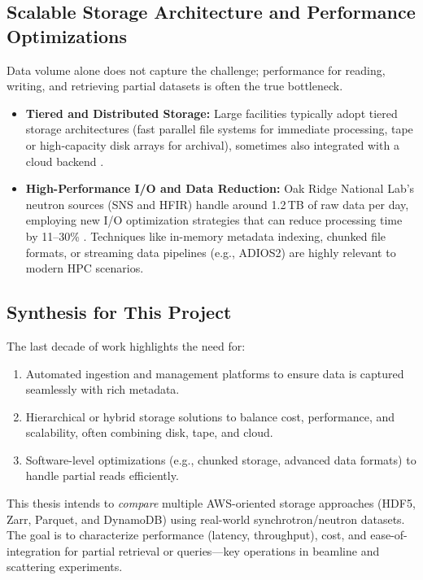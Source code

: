 \documentclass{article}
\begin{document}
\subsection{Scalable Storage Architecture and Performance Optimizations}
Data volume alone does not capture the challenge; performance for reading, writing, and retrieving partial datasets is often the true bottleneck.

\begin{itemize}
    \item \textbf{Tiered and Distributed Storage:} Large facilities typically adopt tiered storage architectures (fast parallel file systems for immediate processing, tape or high-capacity disk arrays for archival), sometimes also integrated with a cloud backend \cite{meyer2014store}.
    \item \textbf{High-Performance I/O and Data Reduction:} Oak Ridge National Lab’s neutron sources (SNS and HFIR) handle around 1.2\,TB of raw data per day, employing new I/O optimization strategies that can reduce processing time by 11--30\% \cite{godoy2021efficient}. Techniques like in-memory metadata indexing, chunked file formats, or streaming data pipelines (e.g., ADIOS2) are highly relevant to modern HPC scenarios.
\end{itemize}

\subsection{Synthesis for This Project}
The last decade of work highlights the need for:
\begin{enumerate}
    \item Automated ingestion and management platforms to ensure data is captured seamlessly with rich metadata.
    \item Hierarchical or hybrid storage solutions to balance cost, performance, and scalability, often combining disk, tape, and cloud.
    \item Software-level optimizations (e.g., chunked storage, advanced data formats) to handle partial reads efficiently.
\end{enumerate}
This thesis intends to \emph{compare} multiple AWS-oriented storage approaches (HDF5, Zarr, Parquet, and DynamoDB) using real-world synchrotron/neutron datasets. The goal is to characterize performance (latency, throughput), cost, and ease-of-integration for partial retrieval or queries—key operations in beamline and scattering experiments.
\end{document}
